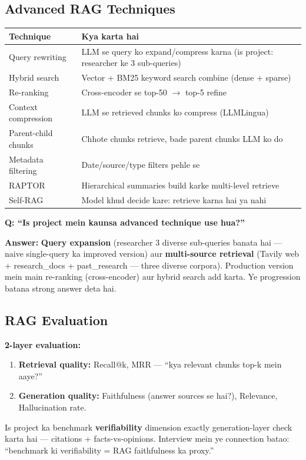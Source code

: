 \subsection{Advanced RAG Techniques}

\begin{longtable}{p{4.2cm} p{9.8cm}}
\toprule
\textbf{Technique} & \textbf{Kya karta hai} \\
\midrule
Query rewriting & LLM se query ko expand/compress karna (is project: researcher ke 3 sub-queries) \\
Hybrid search & Vector + BM25 keyword search combine (dense + sparse) \\
Re-ranking & Cross-encoder se top-50 $\rightarrow$ top-5 refine \\
Context compression & LLM se retrieved chunks ko compress (LLMLingua) \\
Parent-child chunks & Chhote chunks retrieve, bade parent chunks LLM ko do \\
Metadata filtering & Date/source/type filters pehle se \\
RAPTOR & Hierarchical summaries build karke multi-level retrieve \\
Self-RAG & Model khud decide kare: retrieve karna hai ya nahi \\
\bottomrule
\end{longtable}

\begin{interviewbox}
\textbf{Q: ``Is project mein kaunsa advanced technique use hua?''}

\textbf{Answer:} \textbf{Query expansion} (researcher 3 diverse sub-queries banata hai --- naive single-query ka improved version) aur \textbf{multi-source retrieval} (Tavily web + research\_docs + past\_research --- three diverse corpora). Production version mein main re-ranking (cross-encoder) aur hybrid search add karta. Ye progression batana strong answer deta hai.
\end{interviewbox}

\subsection{RAG Evaluation}

\begin{conceptbox}
\textbf{2-layer evaluation:}
\begin{enumerate}[label=\arabic*.]
\item \textbf{Retrieval quality:} Recall@k, MRR --- ``kya relevant chunks top-k mein aaye?''
\item \textbf{Generation quality:} Faithfulness (answer sources se hai?), Relevance, Hallucination rate.
\end{enumerate}
Is project ka benchmark \textbf{verifiability} dimension exactly generation-layer check karta hai --- citations + facts-vs-opinions. Interview mein ye connection batao: ``benchmark ki verifiability = RAG faithfulness ka proxy.''
\end{conceptbox}

